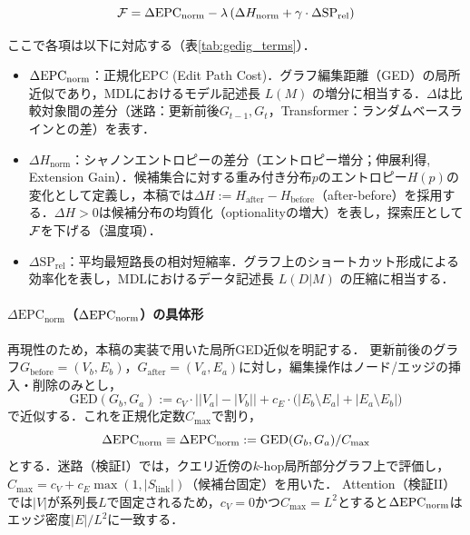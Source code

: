 \begin{equation}
\mathcal{F} = \Delta\mathrm{EPC}_{\mathrm{norm}} - \lambda \left( \Delta H_{\mathrm{norm}} + \gamma \cdot \Delta \mathrm{SP}_{\mathrm{rel}} \right)
\label{eq:gedig}
\end{equation}

ここで各項は以下に対応する（表\ref{tab:gedig_terms}）．
\begin{itemize}
\item $\Delta\mathrm{EPC}_{\mathrm{norm}}$：正規化EPC (Edit Path Cost)．グラフ編集距離（GED）の局所近似であり，MDLにおけるモデル記述長 $L(M)$ の増分に相当する．$\Delta$は比較対象間の差分（迷路：更新前後$G_{t-1},G_t$，Transformer：ランダムベースラインとの差）を表す．
\item $\Delta H_{\mathrm{norm}}$：シャノンエントロピーの差分（エントロピー増分；伸展利得, Extension Gain）．候補集合に対する重み付き分布$p$のエントロピー$H(p)$の変化として定義し，本稿では$\Delta H := H_{\mathrm{after}}-H_{\mathrm{before}}$（after-before）を採用する．$\Delta H>0$は候補分布の均質化（optionalityの増大）を表し，探索圧として$\mathcal{F}$を下げる（温度項）．
\item $\Delta \mathrm{SP}_{\mathrm{rel}}$：平均最短路長の相対短縮率．グラフ上のショートカット形成による効率化を表し，MDLにおけるデータ記述長 $L(D|M)$ の圧縮に相当する．
\end{itemize}

\paragraph{$\Delta\mathrm{EPC}_{\mathrm{norm}}$（$\Delta\mathrm{EPC}_{\mathrm{norm}}$）の具体形}
再現性のため，本稿の実装で用いた局所GED近似を明記する．
更新前後のグラフ$G_{\mathrm{before}}=(V_b,E_b)$，$G_{\mathrm{after}}=(V_a,E_a)$に対し，編集操作はノード/エッジの挿入・削除のみとし，
\begin{equation}
\mathrm{GED}(G_b,G_a) := c_V\cdot \bigl||V_a|-|V_b|\bigr| + c_E\cdot \bigl(|E_b\setminus E_a|+|E_a\setminus E_b|\bigr)
\end{equation}
で近似する．これを正規化定数$C_{\max}$で割り，
\begin{equation}
\Delta\mathrm{EPC}_{\mathrm{norm}} \equiv \Delta\mathrm{EPC}_{\mathrm{norm}} := \mathrm{GED}(G_b,G_a)/C_{\max}
\end{equation}
とする．迷路（検証I）では，クエリ近傍の$k$-hop局所部分グラフ上で評価し，$C_{\max}=c_V+c_E\max(1,|S_{\mathrm{link}}|)$（候補台固定）を用いた．
Attention（検証II）では$|V|$が系列長$L$で固定されるため，$c_V=0$かつ$C_{\max}=L^2$とすると$\Delta\mathrm{EPC}_{\mathrm{norm}}$はエッジ密度$|E|/L^2$に一致する．

